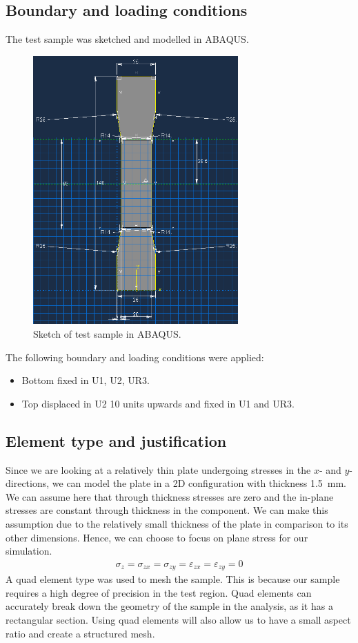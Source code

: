 \documentclass[11pt]{article}
\numberwithin{equation}{section}
\begin{document}
\subsection{Boundary and loading conditions}
The test sample was sketched and modelled in ABAQUS.
\begin{figure}[H]
    \centering
    \includegraphics[width = 0.7\textwidth]{./img/Sketch1.png}
    \caption{Sketch of test sample in ABAQUS.}
    \label{sampleSketch}
\end{figure} 
The following boundary and loading conditions were applied:
\begin{itemize}
    \item Bottom fixed in U1, U2, UR3.
    \item Top displaced in U2 10 units upwards and fixed in U1 and UR3.
\end{itemize}
\subsection{Element type and justification}
Since we are looking at a relatively thin plate undergoing stresses in the $x$- and $y$- directions, we can model the plate in a 2D configuration with thickness \SI{1.5}{\milli\m}. We can assume here that through thickness stresses are zero and the in-plane stresses are constant through thickness in the component. We can make this assumption due to the relatively small thickness of the plate in comparison to its other dimensions. Hence, we can choose to focus on plane stress for our simulation.
\begin{gather}
    \sigma_z = \sigma_{zx} = \sigma_{zy} = \varepsilon_{zx} = \varepsilon_{zy} = 0
\end{gather}
A quad element type was used to mesh the sample. This is because our sample requires a high degree of precision in the test region. Quad elements can accurately break down the geometry of the sample in the analysis, as it has a rectangular section. Using quad elements will also allow us to have a small aspect ratio and create a structured mesh. 
\end{document}
